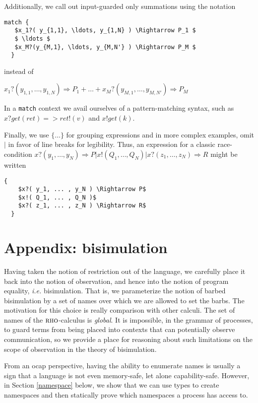 \documentclass[]{acm_proc_article-sp}
\newcommand{\id}[1]{\texttt{#1}}
\newcommand{\juxtap}{\mathbin{\id{|}}}
\newcommand{\binpar}[2]{#1 \juxtap #2}
\numberwithin{equation}{subsection}
\newcommand{\rhoc}{${\textsc{rho}}$-calculus}
\begin{document}
Additionally, we call out input-guarded only summations using the notation

\begin{lstlisting}[mathescape]
  match { 
   $x_1?( y_{1,1}, \ldots, y_{1,N} ) \Rightarrow P_1 $
   $ \ldots $
   $x_M?(y_{M,1}, \ldots, y_{M,N'} ) \Rightarrow P_M $ 
  }
\end{lstlisting}

\noindent instead of 

$x_1?( y_{1,1}, \ldots, y_{1,N} ) \Rightarrow P_1 + \ldots + x_M?( y_{M,1},\ldots, y_{M,N'} ) \Rightarrow P_M$

In a \texttt{match} context we avail ourselves of a pattern-matching
syntax, such as $x ? get( ret ) => ret!( v )$ and $x ! get( k )$.

Finally, we use $\{ \ldots \}$ for grouping expressions and in more complex examples, omit
$\binpar{}{}$ in favor of line breaks for legibility. Thus, an expression for a classic race-condition $\binpar{ x?( y_1, \ldots, y_N ) \Rightarrow P}{\binpar{x!( Q_1, \ldots, Q_N )}{ x?( z_1, \ldots, z_N ) \Rightarrow R}}$ might be written
\begin{lstlisting}[mathescape]
  {
    $x?( y_1, ... , y_N ) \Rightarrow P$
    $x!( Q_1, ... , Q_N )$
    $x?( z_1, ... , z_N ) \Rightarrow R$
  }
\end{lstlisting}

\section{Appendix: bisimulation}

Having taken the notion of restriction out of the language, we
carefully place it back into the notion of observation, and hence into
the notion of program equality, {\em i.e.} bisimulation. That is, we
parameterize the notion of barbed bisimulation by a set of names over
which we are allowed to set the barbs. The motivation for this choice
is really comparison with other calculi. The set of names of the
{\rhoc} is \textit{global}. It is impossible, in the grammar of
processes, to guard terms from being placed into contexts that can
potentially observe communication, so we provide a place for
reasoning about such limitations on the scope of observation in the
theory of bisimulation.

From an ocap perspective, having the ability to enumerate names is
usually a sign that a language is not even memory-safe, let alone
capability-safe.  However, in Section \ref{namespace} below, we show
that we can use types to create namespaces and then statically prove
which namespaces a process has access to.
\end{document}
